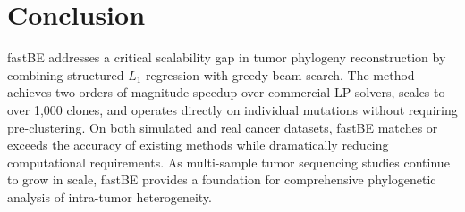 \documentclass[11pt]{article}
\begin{document}
\section{Conclusion}

fastBE addresses a critical scalability gap in tumor phylogeny reconstruction by combining structured $L_1$ regression with greedy beam search. The method achieves two orders of magnitude speedup over commercial LP solvers, scales to over 1,000 clones, and operates directly on individual mutations without requiring pre-clustering. On both simulated and real cancer datasets, fastBE matches or exceeds the accuracy of existing methods while dramatically reducing computational requirements. As multi-sample tumor sequencing studies continue to grow in scale, fastBE provides a foundation for comprehensive phylogenetic analysis of intra-tumor heterogeneity.



\end{document}
